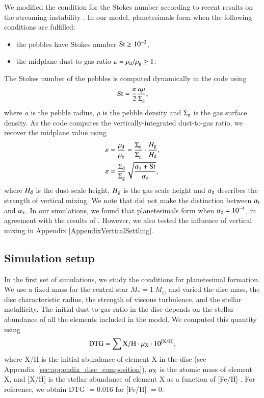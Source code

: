 \documentclass{aa}
\begin{document}
We modified the condition for the Stokes number according to recent results on the streaming instability \citep{LiYoudin2021}. In our model, planetesimals form when the following conditions are fulfilled:
\begin{itemize}
	\item the pebbles have Stokes number ${\rm St} \geq 10^{-3}$,
	\item the midplane dust-to-gas ratio $\varepsilon= \rho_{\rm d}/\rho_{\rm g} \geq 1$.
\end{itemize}
The Stokes number of the pebbles is computed dynamically in the code using
\begin{equation}
	{\rm St} = \frac{\pi}{2}\frac{a\rho}{\Sigma_{\rm g}},
\end{equation}
where $a$ is the pebble radius, $\rho$ is the pebble density and $\Sigma_{\rm g}$ is the gas surface density. As the code computes the vertically-integrated dust-to-gas ratio, we recover the midplane value using 
\begin{align}
	\varepsilon &=\frac{\rho_{\rm d}}{\rho_{\rm g}} = \frac{\Sigma_{\rm d}}{\Sigma_{\rm g}} \cdot \frac{H_{\rm g}}{H_{\rm d}},\\
	\varepsilon  &= \frac{\Sigma_{\rm d}}{\Sigma_{\rm g}}\sqrt{\frac{\alpha_{\rm z}+{\rm St}}{\alpha_{\rm z}}},
\end{align}
where $H_{\rm d}$ is the dust scale height, $H_{\rm g}$ is the gas scale height and $\alpha_{\rm z}$ describes the strength of vertical mixing. We note that \citet{DrazkowskaAlibert2017} did not make the distinction between $\alpha_{\rm t}$ and $\alpha_{\rm z}$. In our simulations, we found that planetesimals form when $\alpha_{\rm z} = 10^{-4}$, in agreement with the results of \citet{DrazkowskaAlibert2017}. However, we also tested the influence of vertical mixing in Appendix \ref{AppendixVerticalSettling}.

\subsection{Simulation setup}
In the first set of simulations, we study the conditions for planetesimal formation. We use a fixed mass for the central star $M_* = 1~M_{\odot}$ and varied the disc mass, the disc characteristic radius, the strength of viscous turbulence, and the stellar metallicity. The initial dust-to-gas ratio in the disc depends on the stellar abundance of all the elements included in the model. We computed this quantity using
\begin{equation}
    \label{eq:DTG}
    {\rm DTG} = \sum {\rm X/H} \cdot \mu_{\rm X} \cdot 10^{\rm [X/H]},
\end{equation}
where X/H is the initial abundance of element X in the disc (see Appendix~\ref{sec:appendix_disc_composition}), $\mu_{\rm X}$ is the atomic mass of element X, and [X/H] is the stellar abundance of element X as a function of [Fe/H] \citep{BitschBattistini2020}. For reference, we obtain DTG $= 0.016$ for [Fe/H] $= 0$.
\end{document}
